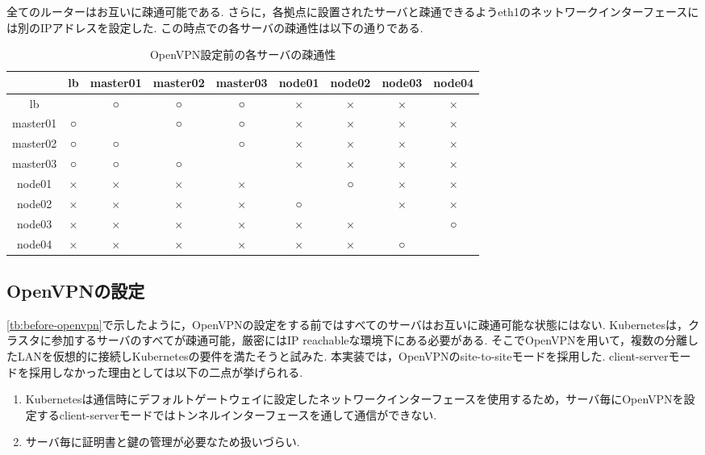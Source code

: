 全てのルーターはお互いに疎通可能である.
さらに，各拠点に設置されたサーバと疎通できるようeth1のネットワークインターフェースには別のIPアドレスを設定した.
この時点での各サーバの疎通性は以下の通りである.

\begin{table}[htb]
  \begin{center}
    \caption{OpenVPN設定前の各サーバの疎通性}
    \begin{tabular}{|c|c|c|c|c|c|c|c|c|} \hline
      & lb & master01 & master02 & master03 & node01 & node02 & node03 & node04 \\ \hline
      lb & \ & ○ & ○ & ○ & × & × & × & × \\ \hline
      master01 & ○ & \ & ○ & ○ & × & × & × & × \\ \hline
      master02 & ○ & ○ & \ & ○ & × & × & × & × \\ \hline
      master03 & ○ & ○ & ○ & \ & × & × & × & × \\ \hline
      node01 & × & × & × & × & \ & ○ & × & × \\ \hline
      node02 & × & × & × & × & ○ & \ & × & × \\ \hline
      node03 & × & × & × & × & × & × & \ & ○ \\ \hline
      node04 & × & × & × & × & × & × & ○ & \ \\ \hline
    \end{tabular}
  \end{center}
\end{table}
\label{tb:before-openvpn}

\subsection{OpenVPNの設定}

\ref{tb:before-openvpn}で示したように，OpenVPNの設定をする前ではすべてのサーバはお互いに疎通可能な状態にはない.
Kubernetesは，クラスタに参加するサーバのすべてが疎通可能，厳密にはIP reachableな環境下にある必要がある.
そこでOpenVPNを用いて，複数の分離したLANを仮想的に接続しKubernetesの要件を満たそうと試みた.
本実装では，OpenVPNのsite-to-siteモードを採用した.
client-serverモードを採用しなかった理由としては以下の二点が挙げられる.

\begin{enumerate}
  \item Kubernetesは通信時にデフォルトゲートウェイに設定したネットワークインターフェースを使用するため，サーバ毎にOpenVPNを設定するclient-serverモードではトンネルインターフェースを通して通信ができない.
  \item サーバ毎に証明書と鍵の管理が必要なため扱いづらい.
\end{enumerate}

